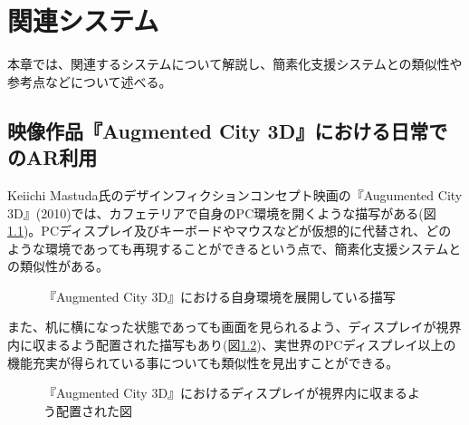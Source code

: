 
\chapter{関連システム}
\label{chap:relatedSystem}

本章では、関連するシステムについて解説し、簡素化支援システムとの類似性や参考点などについて述べる。

\newpage

\section{映像作品『Augmented City 3D』における日常でのAR利用}

Keiichi Mastuda氏のデザインフィクションコンセプト映画の『Augumented City 3D』(2010)\cite{arcity}では、カフェテリアで自身のPC環境を開くような描写がある(図\ref{fig:arcity01})。PCディスプレイ及びキーボードやマウスなどが仮想的に代替され、どのような環境であっても再現することができるという点で、簡素化支援システムとの類似性がある。

\begin{figure}[htbp]
  \begin{center}
  \end{center}
  \caption{『Augmented City 3D』における自身環境を展開している描写}
  \label{fig:arcity01}
\end{figure}

また、机に横になった状態であっても画面を見られるよう、ディスプレイが視界内に収まるよう配置された描写もあり(図\ref{fig:arcity02})、実世界のPCディスプレイ以上の機能充実が得られている事についても類似性を見出すことができる。

\begin{figure}[htbp]
  \begin{center}
  \end{center}
  \caption{『Augmented City 3D』におけるディスプレイが視界内に収まるよう配置された図}
  \label{fig:arcity02}
\end{figure}

